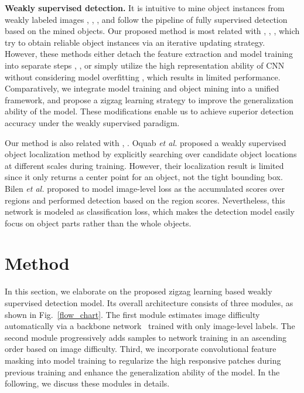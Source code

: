 \documentclass[10pt,twocolumn,letterpaper]{article}
\begin{document}
\textbf{Weakly supervised detection.} It is intuitive to mine object instances from weakly labeled images \cite{song2014weakly}, \cite{wang2014weakly}, \cite{Li_2016_CVPR}, and follow the pipeline of fully supervised detection based on the mined objects. Our proposed method is most related with \cite{cinbis2014multi}, \cite{Li_2016_CVPR}, \cite{Tang_2017_CVPR}, which try to obtain reliable object instances via an iterative updating strategy. However, these methods either detach the feature extraction and model training into separate steps \cite{cinbis2014multi}, \cite{Li_2016_CVPR}, or simply utilize the high representation ability of CNN without considering model overfitting \cite{Tang_2017_CVPR}, which results in limited performance. Comparatively, we integrate model training and object mining into a unified framework, and propose a zigzag learning strategy to improve the generalization ability of the model. These modifications enable us to achieve superior detection accuracy under the weakly supervised paradigm.

Our method is also related with  \cite{oquab2015object}, \cite{Bilen_2016_CVPR}. Oquab \emph{et al.} \cite{oquab2015object} proposed a weakly supervised object localization method by explicitly searching over candidate object locations at different scales during training. However, their localization result is limited since it only returns a center point for an object, not the tight bounding box. Bilen \cite{Bilen_2016_CVPR} \emph{et al.} proposed to model image-level loss as the accumulated scores over regions and performed detection based on the region scores. Nevertheless, this network is modeled as classification loss, which makes the detection model easily focus on object parts rather than the whole objects.






\section{Method}
In this section, we elaborate on the proposed zigzag learning based weakly supervised detection model. Its overall architecture consists of three modules, as shown in Fig.~\ref{flow_chart}. The first module estimates image difficulty automatically via a backbone network~\cite{bency2016weakly} trained with only image-level labels. The second module progressively adds samples to network training in an ascending order based on image difficulty. Third, we incorporate convolutional feature masking into model training to regularize the high responsive patches during previous training and enhance the generalization ability of the model. In the following, we discuss these modules in details.
\end{document}
